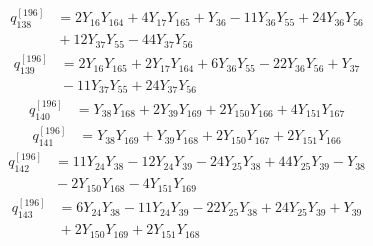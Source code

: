\begin{equation}\label{q196:row:138}
\begin{aligned}
q_{138}^{[196]} &={} 2Y_{16}Y_{164} + 4Y_{17}Y_{165} + Y_{36} - 11Y_{36}Y_{55} + 24Y_{36}Y_{56}\\
&{} + 12Y_{37}Y_{55} - 44Y_{37}Y_{56}
\end{aligned}
\end{equation}
\begin{equation}\label{q196:row:139}
\begin{aligned}
q_{139}^{[196]} &={} 2Y_{16}Y_{165} + 2Y_{17}Y_{164} + 6Y_{36}Y_{55} - 22Y_{36}Y_{56} + Y_{37}\\
&{} - 11Y_{37}Y_{55} + 24Y_{37}Y_{56}
\end{aligned}
\end{equation}
\begin{equation}\label{q196:row:140}
\begin{aligned}
q_{140}^{[196]} &={} Y_{38}Y_{168} + 2Y_{39}Y_{169} + 2Y_{150}Y_{166} + 4Y_{151}Y_{167}
\end{aligned}
\end{equation}
\begin{equation}\label{q196:row:141}
\begin{aligned}
q_{141}^{[196]} &={} Y_{38}Y_{169} + Y_{39}Y_{168} + 2Y_{150}Y_{167} + 2Y_{151}Y_{166}
\end{aligned}
\end{equation}
\begin{equation}\label{q196:row:142}
\begin{aligned}
q_{142}^{[196]} &={} 11Y_{24}Y_{38} - 12Y_{24}Y_{39} - 24Y_{25}Y_{38} + 44Y_{25}Y_{39} - Y_{38}\\
&{} - 2Y_{150}Y_{168} - 4Y_{151}Y_{169}
\end{aligned}
\end{equation}
\begin{equation}\label{q196:row:143}
\begin{aligned}
q_{143}^{[196]} &={} 6Y_{24}Y_{38} - 11Y_{24}Y_{39} - 22Y_{25}Y_{38} + 24Y_{25}Y_{39} + Y_{39}\\
&{} + 2Y_{150}Y_{169} + 2Y_{151}Y_{168}
\end{aligned}
\end{equation}
